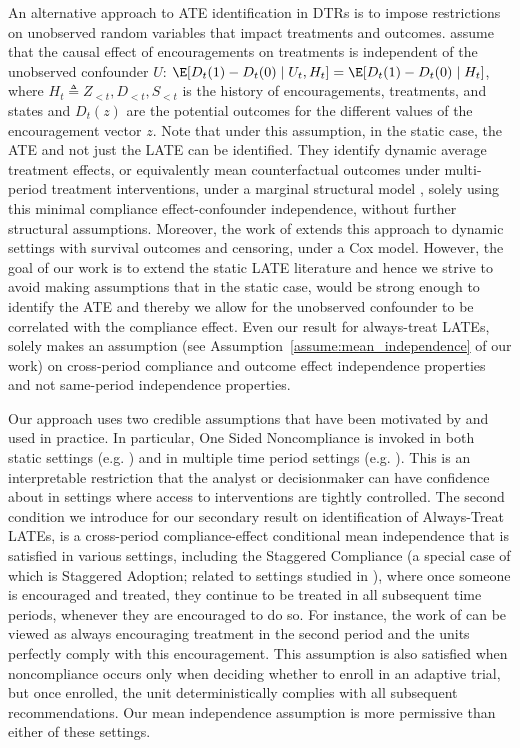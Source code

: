 An alternative approach to ATE identification in DTRs is to impose restrictions on unobserved random variables that impact treatments and outcomes.
\cite{michael2023instrumental} assume that the causal effect of encouragements on treatments 
is independent of the unobserved confounder $U$: $\E[D_t(1) - D_t(0) \mid U_t, H_t]=\E[D_t(1) - D_t(0) \mid H_t]$, where $H_t \triangleq Z_{<t}, D_{<t}, S_{<t}$ is the history of encouragements, treatments, and states and $D_t(z)$ are the potential outcomes for the different values of the encouragement vector $z$. Note that under this assumption, in the static case, the ATE and not just the LATE can be identified.
They identify dynamic average treatment effects, or equivalently mean counterfactual outcomes under multi-period treatment interventions, under a marginal structural model \citep{robins1986new}, solely using this minimal compliance effect-confounder independence, without further structural assumptions. Moreover, the work of \citep{cui2023instrumental} extends this approach to dynamic settings with survival outcomes and censoring, under a Cox model. However, the goal of our work is to extend the static LATE literature and hence we strive to avoid making assumptions that in the static case, would be strong enough to identify the ATE and thereby we allow for the unobserved confounder to be correlated with the compliance effect. Even our result for always-treat LATEs, solely makes an assumption (see Assumption~\ref{assume:mean_independence} of our work) on cross-period compliance and outcome effect independence properties and not same-period independence properties. 


Our approach uses two credible assumptions that have been motivated by and used in practice.
In particular, One Sided Noncompliance is invoked in both static settings (e.g. \cite{frolich2013identification}) and in multiple time period settings (e.g. 
\cite{bijwaard2005correcting}).
This is an interpretable restriction that the analyst or decisionmaker can have confidence about in settings where access to interventions are tightly controlled.
The second condition we introduce for our secondary result on identification of Always-Treat LATEs, is a cross-period compliance-effect conditional mean independence that is satisfied in various settings, including the Staggered Compliance (a special case of which is Staggered Adoption; related to settings studied in \cite{heckman2007dynamic,heckman2016dynamic,ferman2023identifying}),  
where once someone is encouraged and treated, they continue to be treated in all subsequent time periods, whenever they are encouraged to do so. For instance, the work of \citep{ferman2023identifying} can be viewed as always encouraging treatment in the second period and the units perfectly comply with this encouragement.
This assumption is also satisfied when noncompliance occurs only when deciding whether to enroll in an adaptive trial, but once enrolled, the unit deterministically complies with all subsequent recommendations.
Our mean independence assumption is more permissive than either of these settings.

